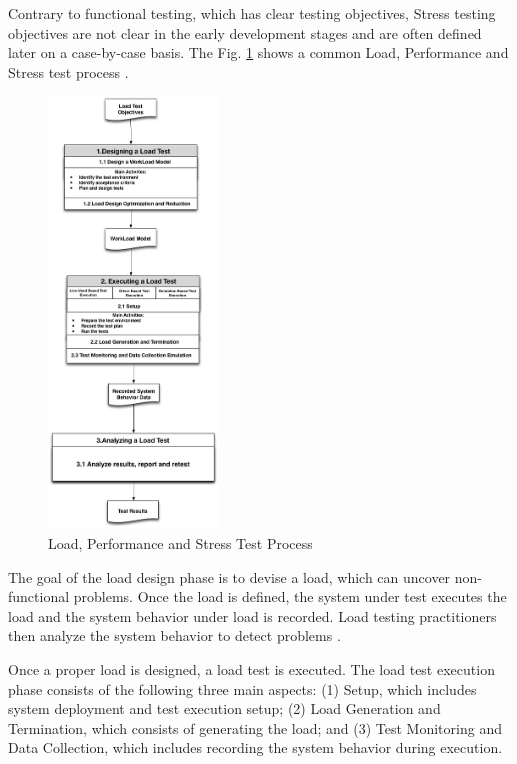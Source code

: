 \documentclass[espaco=umemeio,chapter=TITLE,twoside,openright]{abnt}
\begin{document}
Contrary to functional testing, which has clear testing objectives, Stress testing objectives are not clear in the early development stages and are often defined later on a case-by-case basis. The Fig. \ref{fig:testprocess} shows a common Load, Performance and Stress test process  \cite{Jiang2010}.

\begin{figure}[!ht]
\centering
\includegraphics[width=0.4\textwidth]{./images/testprocess.png}
\caption{Load, Performance and Stress Test Process \cite{Jiang2010}\cite{Erinle2013}}
\label{fig:testprocess}
\end{figure}


The goal of the load design phase is to devise a load, which can uncover non-functional problems. Once the load is defined, the system under test executes the load and the system behavior under load is recorded. Load testing practitioners then analyze the system behavior to detect problems \cite{Jiang2010}.

Once a proper load is designed, a load test is executed. The load test execution phase consists of the following three main aspects: (1) Setup, which includes system deployment and test execution setup; (2) Load Generation and Termination, which consists of generating the load; and (3) Test Monitoring and Data Collection, which includes recording the system behavior during execution\cite{Jiang2010}.
\end{document}
